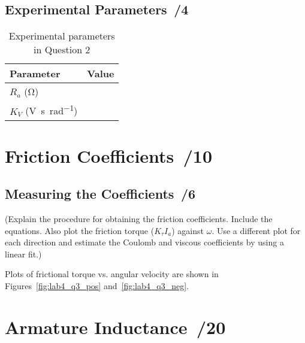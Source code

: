 \documentclass{article}
\newcommand{\score}{\hfill \underline{\hspace{0.65cm}}\,/} %
\begin{document}
\subsection{Experimental Parameters \score 4}
\begin{table}[phtb] 
\begin{center}
\caption{Experimental parameters in Question 2}
\label{tbl:lab4_q2_2}
\begin{tabular}{l|r} \hline \hline
\cellcolor{lightgray} Parameter & \cellcolor{lightgray} Value \\
\hline
$R_a$ (\si{\ohm}) &  \\ \hline
$K_V$ (\si{\volt\second\per\radian}) &  \\ \hline
\end{tabular}
\end{center}
\end{table}

\section{Friction Coefficients \score 10}
\subsection{Measuring the Coefficients \score 6}
(Explain the procedure for obtaining the friction coefficients. Include the equations. Also plot the friction torque ($K_{\tau}I_a$) against $\omega$. Use a different plot for each direction and estimate the Coulomb and viscous coefficients by using a linear fit.) 

Plots of frictional torque vs. angular velocity are shown in Figures~\ref{fig:lab4_q3_pos} and~\ref{fig:lab4_q3_neg}.
 



\section{Armature Inductance \score 20}
\end{document}
